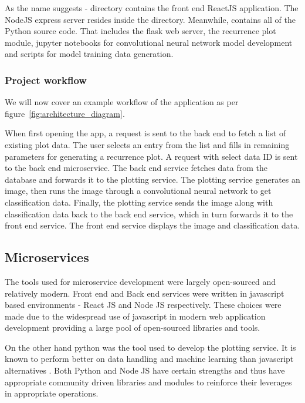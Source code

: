 \documentclass[a4paper,12pt,fleqn]{article}
\begin{document}
As the name suggests -  directory contains the front end ReactJS application.
The NodeJS express\cite{express} server resides inside the  directory.
Meanwhile,  contains all of the Python source code. That includes the flask \cite{flask} web server, the recurrence plot module, jupyter notebooks for convolutional neural network model development and scripts for model training data generation.


\subsubsection{Project workflow}
We will now cover an example workflow of the application as per figure~\ref{fig:architecture_diagram}.

When first opening the app, a request is sent to the back end to fetch a list of existing plot data. 
The user selects an entry from the list and fills in remaining parameters for generating a recurrence plot.
A request with select data ID is sent to the back end microservice.
The back end service fetches data from the database and forwards it to the plotting service.
The plotting service generates an image, then runs the image through a convolutional neural network to get classification data.
Finally, the plotting service sends the image along with classification data back to the back end service, which in turn forwards it to the front end service.
The front end service displays the image and classification data.


\subsection{Microservices}
The tools used for microservice development were largely open-sourced and relatively modern. 
Front end and Back end services were written in javascript  
based environments - React JS and Node JS respectively.
These choices were made due to the widespread use of javascript in modern web application development providing a large pool of open-sourced libraries and tools.

On the other hand python was the tool used to develop the plotting service. It is known to perform better on data handling and machine learning than javascript alternatives \cite{javascript_vs_python_ml}.
Both Python and Node JS have certain strengths and thus have appropriate community driven libraries and modules to reinforce their leverages in appropriate operations.
\end{document}
